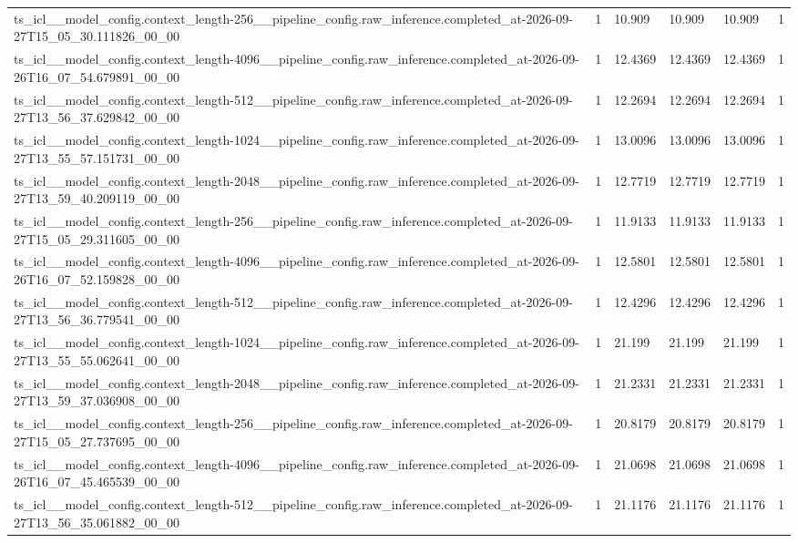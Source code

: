 \begin{tabular}{llllll}
ts\_icl\_\_model\_config.context\_length-256\_\_pipeline\_config.raw\_inference.completed\_at-2026-09-27T15\_05\_30.111826\_00\_00 & 1 & 10.909 & 10.909 & 10.909 & 1 \\
ts\_icl\_\_model\_config.context\_length-4096\_\_pipeline\_config.raw\_inference.completed\_at-2026-09-26T16\_07\_54.679891\_00\_00 & 1 & 12.4369 & 12.4369 & 12.4369 & 1 \\
ts\_icl\_\_model\_config.context\_length-512\_\_pipeline\_config.raw\_inference.completed\_at-2026-09-27T13\_56\_37.629842\_00\_00 & 1 & 12.2694 & 12.2694 & 12.2694 & 1 \\
ts\_icl\_\_model\_config.context\_length-1024\_\_pipeline\_config.raw\_inference.completed\_at-2026-09-27T13\_55\_57.151731\_00\_00 & 1 & 13.0096 & 13.0096 & 13.0096 & 1 \\
ts\_icl\_\_model\_config.context\_length-2048\_\_pipeline\_config.raw\_inference.completed\_at-2026-09-27T13\_59\_40.209119\_00\_00 & 1 & 12.7719 & 12.7719 & 12.7719 & 1 \\
ts\_icl\_\_model\_config.context\_length-256\_\_pipeline\_config.raw\_inference.completed\_at-2026-09-27T15\_05\_29.311605\_00\_00 & 1 & 11.9133 & 11.9133 & 11.9133 & 1 \\
ts\_icl\_\_model\_config.context\_length-4096\_\_pipeline\_config.raw\_inference.completed\_at-2026-09-26T16\_07\_52.159828\_00\_00 & 1 & 12.5801 & 12.5801 & 12.5801 & 1 \\
ts\_icl\_\_model\_config.context\_length-512\_\_pipeline\_config.raw\_inference.completed\_at-2026-09-27T13\_56\_36.779541\_00\_00 & 1 & 12.4296 & 12.4296 & 12.4296 & 1 \\
ts\_icl\_\_model\_config.context\_length-1024\_\_pipeline\_config.raw\_inference.completed\_at-2026-09-27T13\_55\_55.062641\_00\_00 & 1 & 21.199 & 21.199 & 21.199 & 1 \\
ts\_icl\_\_model\_config.context\_length-2048\_\_pipeline\_config.raw\_inference.completed\_at-2026-09-27T13\_59\_37.036908\_00\_00 & 1 & 21.2331 & 21.2331 & 21.2331 & 1 \\
ts\_icl\_\_model\_config.context\_length-256\_\_pipeline\_config.raw\_inference.completed\_at-2026-09-27T15\_05\_27.737695\_00\_00 & 1 & 20.8179 & 20.8179 & 20.8179 & 1 \\
ts\_icl\_\_model\_config.context\_length-4096\_\_pipeline\_config.raw\_inference.completed\_at-2026-09-26T16\_07\_45.465539\_00\_00 & 1 & 21.0698 & 21.0698 & 21.0698 & 1 \\
ts\_icl\_\_model\_config.context\_length-512\_\_pipeline\_config.raw\_inference.completed\_at-2026-09-27T13\_56\_35.061882\_00\_00 & 1 & 21.1176 & 21.1176 & 21.1176 & 1 \\

\end{tabular}
